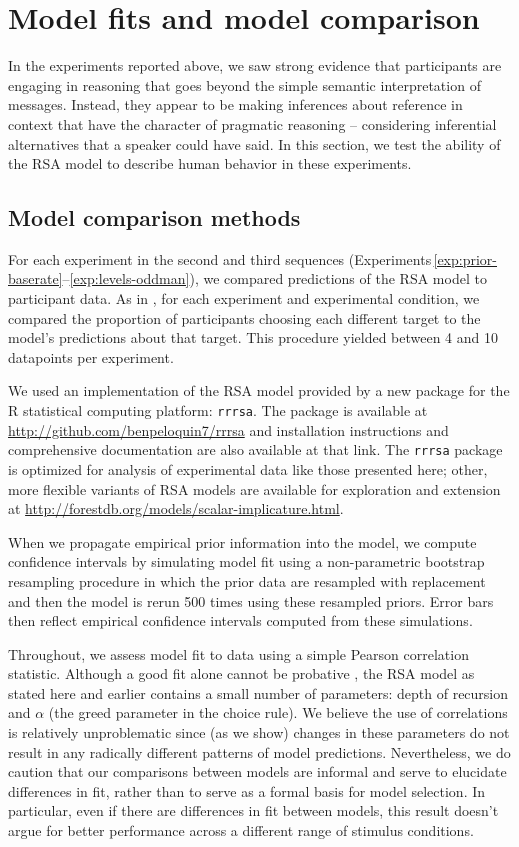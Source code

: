 \documentclass[man,noapacite]{apa2}
\newcounter{Experiment}
\newcommand{\exptrefrange}[2]{Experiments\,\ref{#1}--\ref{#2}}
\begin{document}
\section{Model fits and model comparison}
\label{sec:modelcomp}

In the experiments reported above, we saw strong evidence that participants are engaging in reasoning that goes beyond the simple semantic interpretation of messages. Instead, they appear to be making inferences about reference in context that have the character of pragmatic reasoning -- considering inferential alternatives that a speaker could have said. In this section, we test the ability of the RSA model to describe human behavior in these experiments.


\subsection{Model comparison methods}

For each experiment in the second and third sequences (\exptrefrange{exp:prior-baserate}{exp:levels-oddman}), we compared predictions of the RSA model to participant data. As in , for each experiment and experimental condition, we compared the proportion of participants choosing each different target to the model's predictions about that target. This procedure yielded between 4 and 10 datapoints per experiment.

We used an implementation of the RSA model provided by a new package for the R statistical computing platform: \texttt{rrrsa}. The package is available at \url{http://github.com/benpeloquin7/rrrsa} and installation instructions and comprehensive documentation are also available at that link. The \texttt{rrrsa} package is optimized for analysis of experimental data like those presented here; other, more flexible variants of RSA models are available for exploration and extension at \url{http://forestdb.org/models/scalar-implicature.html}.

When we propagate empirical  prior information into the model, we compute confidence intervals by simulating model fit using a non-parametric bootstrap resampling procedure in which the prior data are resampled with replacement and then the model is rerun 500 times using these resampled priors. Error bars then reflect empirical confidence intervals computed from these simulations.

Throughout, we assess model fit to data using a simple Pearson correlation statistic. Although a good fit alone cannot be probative \cite{roberts2000}, the RSA model as stated here and earlier contains a small number of parameters: depth of recursion and $\alpha$ (the greed parameter in the choice rule). We believe the use of correlations is relatively unproblematic since (as we show) changes in these parameters do not result in any radically different patterns of model predictions. Nevertheless, we do caution that our comparisons between models are informal and serve to elucidate differences in fit, rather than to serve as a formal basis for model selection. In particular, even if there are differences in fit between models, this result doesn't argue for better performance across a different range of stimulus conditions.
\end{document}
